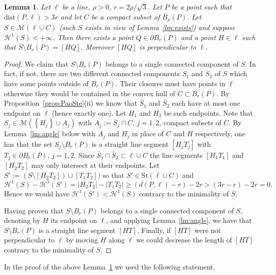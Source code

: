 \documentclass{amsart}
\renewcommand{\H}{\mathcal H}
\newcommand{\abs}[1]{\left\vert #1 \right\vert}
\newcommand{\ENCLOSE}[1]{\left\{#1\right\}}
\newcommand{\St}{\mathrm{St}}
\newcommand{\M}{\mathcal{M}}
\renewcommand{\H}{\mathcal{H}}
\newcommand{\dist}{\mathrm{dist}}
\newtheorem{lemma}[theorem]{Lemma}
\theoremstyle{definition}
\theoremstyle{remark}
\begin{document}
\begin{lemma}\label{lm:base}
  Let $\ell$ be a line, $\rho>0$, 
  $r=2\rho/\sqrt 3$.
  Let $P$ be a point such that $\dist(P,\ell)>3r$
  and let $C$ be a compact subset of $\bar B_\rho(P)$.
  Let $S \in \M(\ell\cup C)$ 
  (such $S$ exists in view of Lemma~\ref{lm:exists})
  and suppose $\H^1(S)<+\infty$.
  Then there exists a point $Q\in \partial B_r(P)$ 
  and a point $H\in \ell$
  such that $\bar S\setminus B_r(P) = [HQ]$.
  Moreover $[HQ]$ is perpendicular to $\ell$.
\end{lemma}
\begin{proof}
  We claim that $S\setminus B_r(P)$ belongs to 
  a single connected component of $S$. 
  In fact, if not, there are two different connected components 
  $S_1$ and $S_2$ of $S$ which have some points outside of 
  $B_r(P)$. 
  Their closures must have points in $\ell$ otherwise 
  they would be contained in the convex hull of $C\subset B_r(P)$.
  By Proposition~\ref{prop:PaoSte}(ii) we know  
  that $\bar S_1$ and $\bar S_2$ each have 
  at most one endpoint on $\ell$ (hence exactly one).
  Let $H_1$ and $H_2$ be such endpoints.
  Note that $S_j\in \M(\ENCLOSE{H_j}\cup A_j)$ 
  with $A_j:=\bar S_j\cap C$, $j=1,2$, compact subsets of $C$. 
  By Lemma~\ref{lm:angle} below
  with $A_j$ and $H_j$ in place of $C$ and $H$ respectively,
  one has that
  the set $S_j\setminus B_r(P)$ is a straight line segment $[H_j T_j]$
  with $T_j\in \partial B_r(P)$, $j=1,2$.
  Since $\bar S_1\cap \bar S_2\subset \ell\cup C$ 
  the line segments $[H_1T_1]$ and $[H_2T_2]$ may only intersect at their endpoints.
  Let $S':=(S\setminus [H_2T_2])\cup[T_1T_2])$ so that 
  $S'\in \St(\ell\cup C)$ and
  \[
    \H^1(S) - \H^1(S')
    = \abs{H_2 T_2} - \abs{T_1T_2}
    \ge (d(P,\ell)-r) - 2r 
    > (3r-r) - 2r = 0. 
  \]
  Hence we would have $\H^1(S')<\H^1(S)$ contrary to the minimality of $S$.

  Having proven that $S\setminus B_r(P)$ belongs to a single 
  connected component of $S$, 
  denoting by $H$ its endpoint on $\ell$,
  and applying Lemma~\ref{lm:angle}, we have that 
  $S\setminus B_r(P)$ is a straight line segment $[HT]$.
  Finally, if $[HT]$ were not perpendicular to $\ell$ by moving $H$ along $\ell$ 
  we could decrease the length of $[HT]$ contrary to the minimality 
  of $S$.
\end{proof}
  
In the proof of the above Lemma~\ref{lm:base} we used the following statement.
\end{document}
